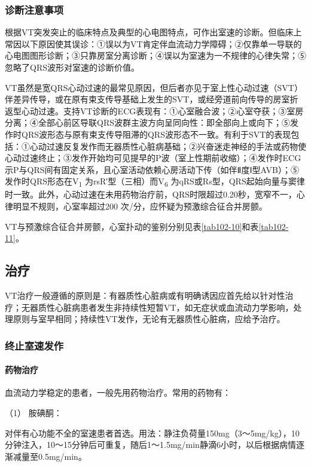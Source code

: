 \subsubsection{诊断注意事项}

根据VT突发突止的临床特点及典型的心电图特点，可作出室速的诊断。但临床上常因以下原因使其误诊：①误以为VT肯定伴血流动力学障碍；②仅靠单一导联的心电图图形诊断；③只靠房室分离诊断；④误以为室速为一不规律的心律失常；⑤忽略了QRS波形对室速的诊断价值。

VT虽然是宽QRS心动过速的最常见原因，但后者亦见于室上性心动过速（SVT）伴差异传导，或在原有束支传导基础上发生的SVT，或经旁道前向传导的房室折返型心动过速。支持VT诊断的ECG表现有：①心室融合波；②心室夺获；③室房分离；④全部心前区导联QRS波群主波方向呈同向性：即全部向上或向下；⑤发作时QRS波形态与原有束支传导阻滞的QRS波形态不一致。有利于SVT的表现包括：①心动过速反复发作而无器质性心脏病基础；②兴奋迷走神经的手法或药物使心动过速终止；③发作开始均可见提早的P波（室上性期前收缩）；④发作时ECG示P与QRS间有固定关系，且心室活动依赖心房活动下传（如伴Ⅱ度Ⅰ型AVB）；⑤发作时QRS形态在V\textsubscript{1}
为rsR′型（三相）而V\textsubscript{6}
为qRS或Rs型，QRS起始向量与窦律时一致。此外，心动过速在未用药物治疗前，QRS时限超过0.20秒，宽窄不一，心律明显不规则，心室率超过200
次/分，应怀疑为预激综合征合并房颤。

VT与预激综合征合并房颤，心室扑动的鉴别分别见表\ref{tab102-10}和表\ref{tab102-11}。

\subsection{治疗}

VT治疗一般遵循的原则是：有器质性心脏病或有明确诱因应首先给以针对性治疗；无器质性心脏病患者发生非持续性短暂VT，如无症状或血流动力学影响，处理原则与室早相同；持续性VT发作，无论有无器质性心脏病，应给予治疗。

\subsubsection{终止室速发作}

\paragraph{药物治疗}

血流动力学稳定的患者，一般先用药物治疗。常用的药物有：

\hypertarget{text00292.htmlux5cux23CHP10-2-5-3-1-1-1}{}
（1） 胺碘酮：

对伴有心功能不全的室速患者首选。用法：静注负荷量150mg（3～5mg/kg），10分钟注入，10～15分钟后可重复，随后1～1.5mg/min静滴6小时，以后根据病情逐渐减量至0.5mg/min。

